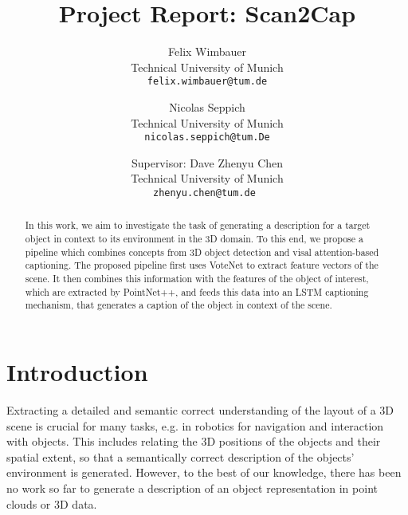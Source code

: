 \documentclass[10pt,twocolumn,letterpaper]{article}
\begin{document}
\title{Project Report: Scan2Cap}

\author{Felix Wimbauer\\
Technical University of Munich\\
{\tt\small felix.wimbauer@tum.de}
\and
Nicolas Seppich\\
Technical University of Munich\\
{\tt\small nicolas.seppich@tum.De}
\and

\small
Supervisor: Dave Zhenyu Chen\\
\small
Technical University of Munich\\
{\tt\small zhenyu.chen@tum.de }
}

\maketitle

\begin{abstract}
	In this work, we aim to investigate the task of generating a description for a target object in context to its environment in the 3D domain. To this end, we propose a pipeline which combines concepts from 3D object detection and visal attention-based captioning. The proposed pipeline first uses VoteNet to extract feature vectors of the scene. It then combines this information with the features of the object of interest, which are extracted by PointNet++, and feeds this data into an LSTM captioning mechanism, that generates a caption of the object in context of the scene.  
   
\end{abstract}

\section{Introduction}

Extracting a detailed and semantic correct understanding of the layout of a 3D scene is crucial for many tasks, e.g. in robotics for navigation and interaction with objects. This includes relating the 3D positions of the objects and their spatial extent, so that a semantically correct description of the objects' environment is generated.
However, to the best of our knowledge, there has been no work so far to generate a description of an object representation in point clouds or 3D data.
\end{document}
